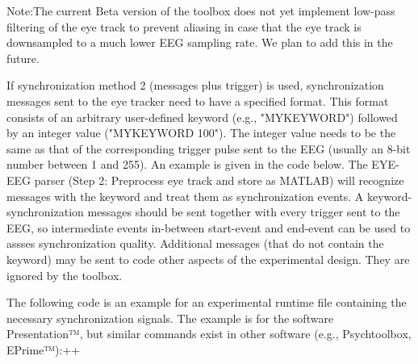 Note:The current Beta version of the toolbox does not yet implement low-pass filtering of the eye track to prevent aliasing in case that the eye track is downsampled to a much lower EEG sampling rate. We plan to add this in the future.

If synchronization method 2 (messages plus trigger) is used, synchronization messages sent to the eye tracker need to have a specified format. This format consists of an arbitrary user-defined keyword (e.g., "MYKEYWORD") followed by an integer value ("MYKEYWORD 100"). The integer value needs to be the same as that of the corresponding trigger pulse sent to the EEG (usually an 8-bit number between 1 and 255). An example is given in the code below. The EYE-EEG parser (Step 2: Preprocess eye track and store as MATLAB) will recognize messages with the keyword and treat them as synchronization events. A keyword-synchronization messages should be sent together with every trigger sent to the EEG, so intermediate events in-between start-event and end-event can be used to assses synchronization quality. Additional messages (that do not contain the keyword) may be sent to code other aspects of the experimental design. They are ignored by the toolbox.

The following code is an example for an experimental runtime file containing the necessary synchronization signals. The example is for the software Presentation™, but similar commands exist in other software (e.g., Psychtoolbox, EPrime™):++


